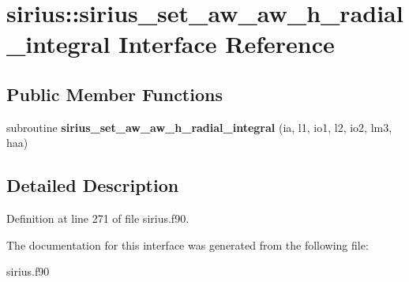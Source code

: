 \hypertarget{interfacesirius_1_1sirius__set__aw__aw__h__radial__integral}{}\section{sirius\+:\+:sirius\+\_\+set\+\_\+aw\+\_\+aw\+\_\+h\+\_\+radial\+\_\+integral Interface Reference}
\label{interfacesirius_1_1sirius__set__aw__aw__h__radial__integral}
\subsection*{Public Member Functions}
\begin{DoxyCompactItemize}
\item 
\hypertarget{interfacesirius_1_1sirius__set__aw__aw__h__radial__integral_a14c8f758820d92b73a13a1956e927b18}{}subroutine {\bfseries sirius\+\_\+set\+\_\+aw\+\_\+aw\+\_\+h\+\_\+radial\+\_\+integral} (ia, l1, io1, l2, io2, lm3, haa)\label{interfacesirius_1_1sirius__set__aw__aw__h__radial__integral_a14c8f758820d92b73a13a1956e927b18}

\end{DoxyCompactItemize}


\subsection{Detailed Description}


Definition at line 271 of file sirius.\+f90.



The documentation for this interface was generated from the following file\+:\begin{DoxyCompactItemize}
\item 
sirius.\+f90\end{DoxyCompactItemize}
